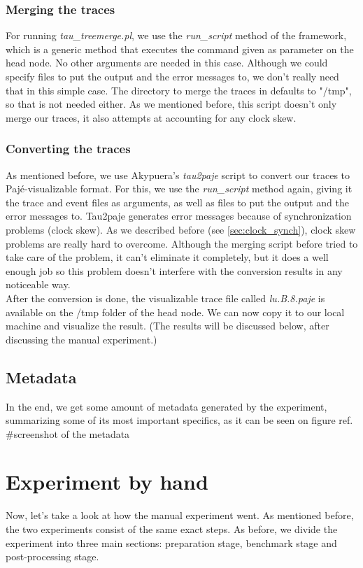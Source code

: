 \subsubsection{Merging the traces}
For running \emph{tau\_treemerge.pl}, we use the \emph{run\_script}
method of the framework, which is a generic method that executes the
command given as parameter on the head node. No other arguments are
needed in this case. Although we could specify files to put the output
and the error messages to, we don't really need that in this simple
case. The directory to merge the traces in defaults to "/tmp", so that
is not needed either. As we mentioned before, this script doesn't only
merge our traces, it also attempts at accounting for any clock skew.
\subsubsection{Converting the traces}
As mentioned before, we use Akypuera's\cite{s13} \emph{tau2paje}
script to convert our traces to Pajé-visualizable format. For this, we
use the \emph{run\_script} method again, giving it the trace and event
files as arguments, as well as files to put the output and the error
messages to. Tau2paje generates error messages because of
synchronization problems (clock skew). As we described before
(see \ref{sec:clock_synch}), clock skew problems are really hard to
overcome. Although the merging script before tried to take care of the
problem, it can't eliminate it completely, but it does a well enough
job so this problem doesn't interfere with the conversion results in
any noticeable way.\\
After the conversion is done, the visualizable trace file called
\emph{lu.B.8.paje} is available on the /tmp folder of the head
node. We can now copy it to our local machine and visualize the
result. (The results will be discussed below, after discussing the
manual experiment.)
\subsection{Metadata}
In the end, we get some amount of metadata generated by the
experiment, summarizing some of its most important specifics, as it
can be seen on figure ref{}.\\
\#screenshot of the metadata\\
\section{Experiment by hand}
Now, let's take a look at how the manual experiment went. As mentioned
before, the two experiments consist of the same exact steps. As
before, we divide the experiment into three main sections:
preparation stage, benchmark stage and post-processing stage.
